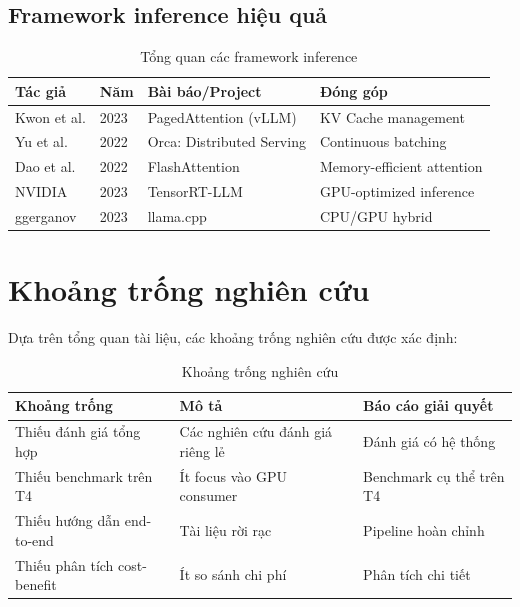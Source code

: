 \documentclass[12pt,a4paper]{report}
\begin{document}
\subsection{Framework inference hiệu quả}

\begin{table}[h]
\centering
\caption{Tổng quan các framework inference}
\label{tab:lit-framework}
\begin{tabular}{p{2.5cm}p{1.5cm}p{5cm}p{3.5cm}}
\toprule
\textbf{Tác giả} & \textbf{Năm} & \textbf{Bài báo/Project} & \textbf{Đóng góp} \\
\midrule
Kwon et al. & 2023 & PagedAttention (vLLM) & KV Cache management \\
Yu et al. & 2022 & Orca: Distributed Serving & Continuous batching \\
Dao et al. & 2022 & FlashAttention & Memory-efficient attention \\
NVIDIA & 2023 & TensorRT-LLM & GPU-optimized inference \\
ggerganov & 2023 & llama.cpp & CPU/GPU hybrid \\
\bottomrule
\end{tabular}
\end{table}

\section{Khoảng trống nghiên cứu}

Dựa trên tổng quan tài liệu, các khoảng trống nghiên cứu được xác định:

\begin{table}[h]
\centering
\caption{Khoảng trống nghiên cứu}
\label{tab:research-gaps}
\begin{tabular}{p{3.5cm}p{5.5cm}p{3.5cm}}
\toprule
\textbf{Khoảng trống} & \textbf{Mô tả} & \textbf{Báo cáo giải quyết} \\
\midrule
Thiếu đánh giá tổng hợp & Các nghiên cứu đánh giá riêng lẻ & Đánh giá có hệ thống \\
Thiếu benchmark trên T4 & Ít focus vào GPU consumer & Benchmark cụ thể trên T4 \\
Thiếu hướng dẫn end-to-end & Tài liệu rời rạc & Pipeline hoàn chỉnh \\
Thiếu phân tích cost-benefit & Ít so sánh chi phí & Phân tích chi tiết \\
\bottomrule
\end{tabular}
\end{table}
\end{document}
